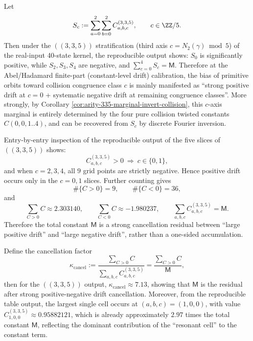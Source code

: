 

\begin{remark}\label{cor:arity-335-collision-residue-drift}
Let
\[
S_c:=\sum_{a=0}^{2}\sum_{b=0}^{2}C^{(3,3,5)}_{a,b,c},
\qquad c\in\ZZ/5.
\]
Then under the \(((3,3,5))\) stratification (third axis $c=N_2(\gamma)\bmod 5$) of the real-input 40-state kernel, the reproducible output shows: $S_0$ is significantly positive, while $S_2,S_3,S_4$ are negative, and $\sum_{c=0}^4 S_c=\mathsf{M}$. Therefore at the Abel/Hadamard finite-part (constant-level drift) calibration, the bias of primitive orbits toward collision congruence class $c$ is mainly manifested as ``strong positive drift at $c=0$ + systematic negative drift at remaining congruence classes''.
More strongly, by Corollary \ref{cor:arity-335-marginal-invert-collision}, this \(c\)-axis marginal is entirely determined by the four pure collision twisted constants \(C(0,0,1..4)\), and can be recovered from \(S_c\) by discrete Fourier inversion.
\end{remark}

\begin{remark}\label{cor:arity-335-sign-sparsity}
Entry-by-entry inspection of the reproducible output of the five slices of \(((3,3,5))\) shows:
\[
C^{(3,3,5)}_{a,b,c}>0\ \Longrightarrow\ c\in\{0,1\},
\]
and when $c=2,3,4$, all $9$ grid points are strictly negative. Hence positive drift occurs only in the $c=0,1$ slices. Further counting gives
\[
\#\{C>0\}=9,\qquad \#\{C<0\}=36,
\]
and
\[
\sum_{C>0}C\approx 2.303140,\qquad
\sum_{C<0}C\approx -1.980237,\qquad
\sum_{a,b,c}C^{(3,3,5)}_{a,b,c}=\mathsf{M}.
\]
Therefore the total constant $\mathsf{M}$ is a strong cancellation residual between ``large positive drift'' and ``large negative drift'', rather than a one-sided accumulation.
\end{remark}

\begin{remark}\label{rem:arity-335-cancel-resonant}
Define the cancellation factor
\[
\kappa_{\mathrm{cancel}}:=\frac{\sum_{C>0}C}{\sum_{a,b,c}C^{(3,3,5)}_{a,b,c}}
=\frac{\sum_{C>0}C}{\mathsf{M}},
\]
then for the \(((3,3,5))\) output,
\(
\kappa_{\mathrm{cancel}}\approx 7.13
\), showing that $\mathsf{M}$ is the residual after strong positive-negative drift cancellation.
Moreover, from the reproducible table output, the largest single cell occurs at
\(
(a,b,c)=(1,0,0)
\), with value
\(
C^{(3,3,5)}_{1,0,0}\approx 0.95882121
\),
which is already approximately $2.97$ times the total constant $\mathsf{M}$, reflecting the dominant contribution of the ``resonant cell'' to the constant term.
\end{remark}

